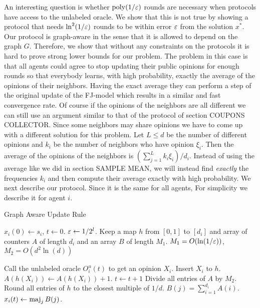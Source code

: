 An interesting question is whether $\mathrm{poly}(1/\varepsilon)$ rounds
are necessary when protocols have access to the unlabeled oracle.
We show that this is not true by showing a protocol
that needs $\ln^2(1/\varepsilon)$ rounds to be within error $\varepsilon$ from
the solution $x^*$. Our protocol is graph-aware in the sense that
it is allowed to depend on the graph $G$. Therefore, we show that
without any constraints on the protocols it is hard to prove strong
lower bounds for our problem. The problem in this case is that
all agents could agree to stop updating their public opinions for
enough rounds so that everybody learns, with high probability, exactly
the average of the opinions of their neighbors. Having the exact
average they can perform a step of the original update of the FJ-model
which results in a similar and fast convergence rate.
Of course if the opinions of the neighbors are all different we can still
use an argument similar to that of the protocol of section COUPONS COLLECTOR.
Since some neighbors may share opinions we have to come up with a different
solution for this problem. Let $L \leq d$ be the number of different
opinions and $k_i$ be the number of neighbors who have opinion $\xi_i$.
Then the average of the opinions of the neighbors is
$(\sum_{j = 1}^L k_i \xi_i)/d_i$. Instead of using the average like
we did in section SAMPLE MEAN, we will instead find \emph{exactly}
the frequencies $k_i$ and then compute their average exactly with high
probability.
We next describe our protocol. Since it is the same for all agents,
For simplicity we describe it for agent $i$.
\begin{algorithm}
  \caption{Graph Aware Update Rule}
  \label{alg:frequencies}
  \begin{algorithmic}[1]
    \State $x_i(0) \gets s_i$, $t \gets 0$.
    \State $\varepsilon \gets 1/2^l$.
    \State Keep a map $h$ from $[0,1]$ to $[d_i]$
    and array of counters $A$ of length $d_i$ and an array $B$ of length
    $M_1$.
    \State $M_1 = O(\ln(1/\varepsilon))$,
    $M_2 = O(d^2 \ln(d))$


    \State Call the unlabeled oracle $O_i^u(t)$ to get an opinion $X_i$.
      \State Insert $X_i$ to $h$.
    \Else
      \State $A(h(X_i)) \gets A(h(X_i)) +1$.
    \EndIf
  \State $t \gets t+1$
\EndFor
  \State Divide all entries of $A$ by $M_2$.  \label{alg:line:counters}
  \State Round all entries of $h$ to the closest multiple of $1/d$.
  \State $B(j) = \sum_{i=1}^{d_i} A(i)$.
\EndFor
\State $x_i(t) \gets \operatorname*{maj}_{j} B(j)$.
\EndFor
\EndFor
\end{algorithmic}
\end{algorithm}

